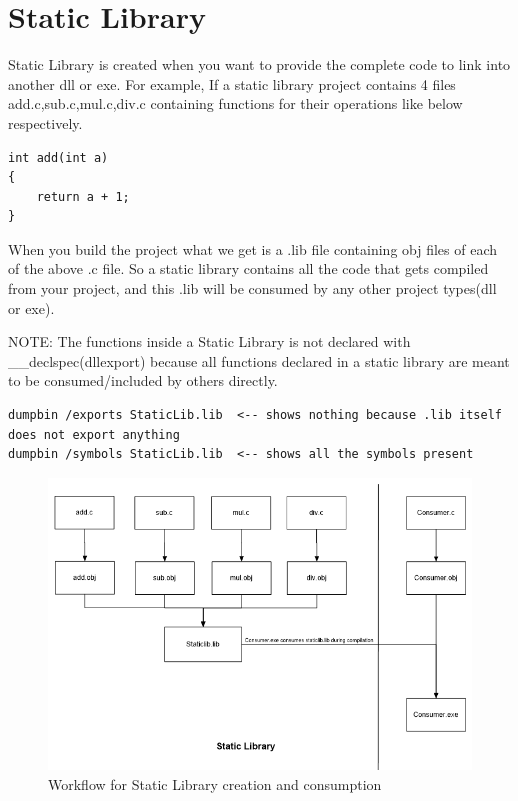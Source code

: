 \documentclass{article}
\begin{document}
\section{Static Library}
Static Library is created when you want to provide the complete code to
link into another dll or exe. For example, If a static library
project contains 4 files add.c,sub.c,mul.c,div.c containing functions
for their operations like below respectively.
\begin{verbatim}
int add(int a)
{
    return a + 1;
}
\end{verbatim}

When you build the project what we get is a .lib file containing obj files
of each of the above .c file. So a static library contains all
the code that gets compiled from your project, and this .lib will
be consumed by any other project types(dll or exe).

NOTE: The functions inside a Static Library is not declared with
\_\_declspec(dllexport) because all functions declared in a static
library are meant to be consumed/included by others directly.

\begin{verbatim}
dumpbin /exports StaticLib.lib  <-- shows nothing because .lib itself does not export anything
dumpbin /symbols StaticLib.lib  <-- shows all the symbols present
\end{verbatim}

\begin{figure}[H]
\centering
\includegraphics[width=\textwidth]{1.StaticLib.png}
\caption{Workflow for Static Library creation and consumption}
\end{figure}
\end{document}
